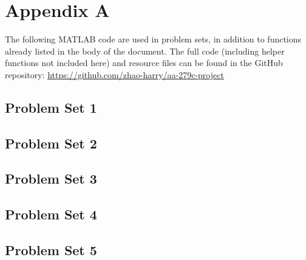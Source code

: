 \appendix

\section{Appendix A}
The following MATLAB code are used in problem sets, in addition to functions already listed in the body of the document. The full code (including helper functions not included here) and resource files can be found in the GitHub repository: \url{https://github.com/zhao-harry/aa-279c-project}

\subsection{Problem Set 1}


\subsection{Problem Set 2}








\subsection{Problem Set 3}



\subsection{Problem Set 4}


\subsection{Problem Set 5}





